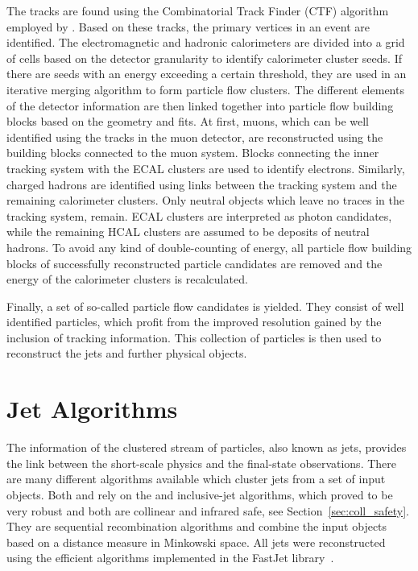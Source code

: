 The tracks are found using the Combinatorial Track Finder (CTF)
algorithm~\cite{Adam:2005cg} employed by \CMS. Based on these tracks, the primary
vertices in an event are identified. The electromagnetic and hadronic
calorimeters are divided into a grid of cells based on the detector granularity
to identify calorimeter cluster seeds. If there are seeds with an energy
exceeding a certain threshold, they are used in an iterative merging algorithm
to form particle flow clusters. The different elements of the detector
information are then linked together into particle flow building blocks based on
the geometry and \chisq fits. At first, muons, which can be well identified
using the tracks in the muon detector, are reconstructed using the building
blocks connected to the muon system. Blocks connecting the inner
tracking system with the ECAL clusters are used to identify electrons.
Similarly, charged hadrons are identified using links between the
tracking system and the remaining calorimeter clusters. Only neutral objects
which leave no traces in the tracking system, remain. ECAL clusters are
interpreted as photon candidates, while the remaining HCAL clusters are assumed
to be deposits of neutral hadrons. To avoid any kind of double-counting of
energy, all particle flow building blocks of successfully reconstructed particle
candidates are removed and the energy of the calorimeter clusters is recalculated.

Finally, a set of so-called particle flow candidates is yielded. They consist of
well identified particles, which profit from the improved resolution gained by
the inclusion of tracking information. This collection of particles is then
used to reconstruct the jets and further physical objects.


\section{Jet Algorithms}
\label{sec:jet_algorithms}

The information of the clustered stream of particles, also known as jets,
provides the link between the short-scale physics and the final-state
observations. There are many different algorithms available which cluster jets
from a set of input objects. Both \CMS and \ATLAS rely on the \antikt and
inclusive-\kt jet algorithms, which proved to be very robust and both are
collinear and infrared safe, see Section~\ref{sec:coll_safety}. They are
sequential recombination algorithms and combine the input objects based on a
distance measure in Minkowski space. All jets were reconstructed using the
efficient algorithms implemented in the FastJet library~\cite{Cacciari:2011ma}.

